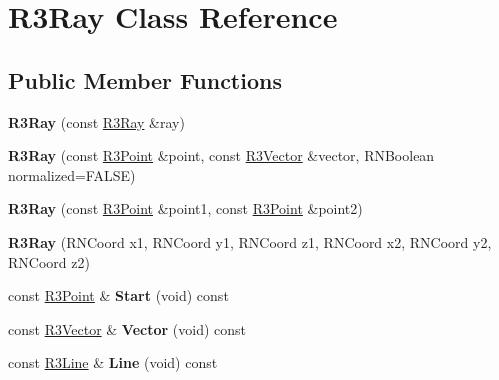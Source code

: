\hypertarget{class_r3_ray}{}\section{R3\+Ray Class Reference}
\label{class_r3_ray}
\subsection*{Public Member Functions}
\begin{DoxyCompactItemize}
\item 
{\bfseries R3\+Ray} (const \hyperlink{class_r3_ray}{R3\+Ray} \&ray)\hypertarget{class_r3_ray_a661801d3d1530813698d2b856bfe96bd}{}\label{class_r3_ray_a661801d3d1530813698d2b856bfe96bd}

\item 
{\bfseries R3\+Ray} (const \hyperlink{class_r3_point}{R3\+Point} \&point, const \hyperlink{class_r3_vector}{R3\+Vector} \&vector, R\+N\+Boolean normalized=F\+A\+L\+SE)\hypertarget{class_r3_ray_a760fe02ba3c2816e74ca8e538dc55f37}{}\label{class_r3_ray_a760fe02ba3c2816e74ca8e538dc55f37}

\item 
{\bfseries R3\+Ray} (const \hyperlink{class_r3_point}{R3\+Point} \&point1, const \hyperlink{class_r3_point}{R3\+Point} \&point2)\hypertarget{class_r3_ray_ab5050711c45525cbfe36207ff0acf8ca}{}\label{class_r3_ray_ab5050711c45525cbfe36207ff0acf8ca}

\item 
{\bfseries R3\+Ray} (R\+N\+Coord x1, R\+N\+Coord y1, R\+N\+Coord z1, R\+N\+Coord x2, R\+N\+Coord y2, R\+N\+Coord z2)\hypertarget{class_r3_ray_aed1608ddde7dbc98ed33793587001aea}{}\label{class_r3_ray_aed1608ddde7dbc98ed33793587001aea}

\item 
const \hyperlink{class_r3_point}{R3\+Point} \& {\bfseries Start} (void) const \hypertarget{class_r3_ray_a21843979bd126c457abd7f4e9432fa8c}{}\label{class_r3_ray_a21843979bd126c457abd7f4e9432fa8c}

\item 
const \hyperlink{class_r3_vector}{R3\+Vector} \& {\bfseries Vector} (void) const \hypertarget{class_r3_ray_a87a14b8c976fd64d761b5c70ed2eb5b3}{}\label{class_r3_ray_a87a14b8c976fd64d761b5c70ed2eb5b3}

\item 
const \hyperlink{class_r3_line}{R3\+Line} \& {\bfseries Line} (void) const \hypertarget{class_r3_ray_a6de24361f520830ab2b395bf7f80026f}{}\label{class_r3_ray_a6de24361f520830ab2b395bf7f80026f}


\end{DoxyCompactItemize}
